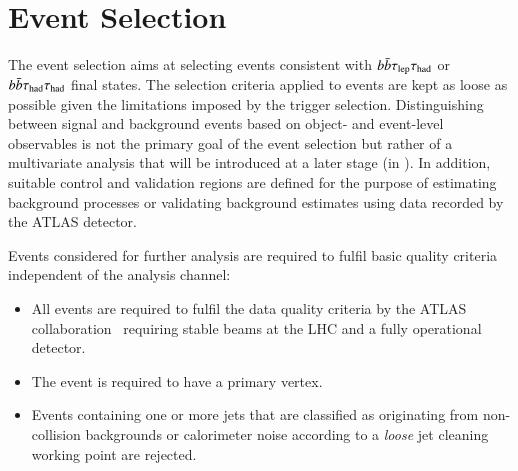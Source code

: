 \section{Event Selection}
\label{sec:event_selection}

The event selection aims at selecting events consistent with
$b\bar{b}\tau_{\text{lep}}\tau_{\text{had}}$ or $b\bar{b}\tau_{\text{had}}\tau_{\text{had}}$ final states. The selection
criteria applied to events are kept as loose as possible given the
limitations imposed by the trigger selection. Distinguishing between
signal and background events based on object- and event-level
observables is not the primary goal of the event selection but rather
of a multivariate analysis that will be introduced at a later stage
(in ). In addition, suitable control
and validation regions are defined for the purpose of estimating
background processes or validating background estimates using data
recorded by the ATLAS detector.

Events considered for further analysis are required to fulfil basic
quality criteria independent of the analysis channel:
\begin{itemize}

\item All events are required to fulfil the data quality criteria by
  the ATLAS collaboration~\cite{DAPR-2018-01} requiring stable beams
  at the LHC and a fully operational detector.

\item The event is required to have a primary vertex.

\item Events containing one or more jets that are classified as originating
  from non-collision backgrounds or calorimeter noise according to a
  \emph{loose} jet cleaning~\cite{ATLAS-CONF-2015-029} working point are
  rejected.
\end{itemize}

